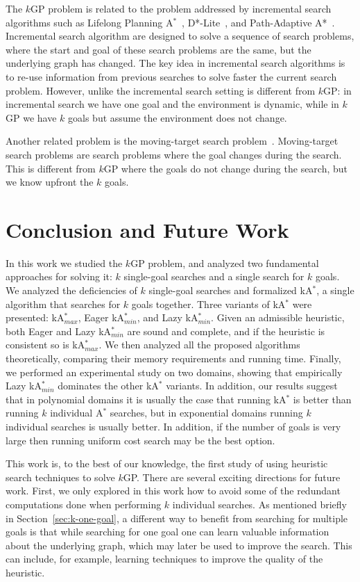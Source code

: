 \documentclass{aicom2e}
\newcommand{\kgs}{$k$GP}
\newcommand{\astar}{A$^*$}
\newcommand{\kastar}{kA$^*$}
\newcommand{\kastarmin}{kA$^*_{min}$}
\newcommand{\kastarmax}{kA$^*_{max}$}
\begin{document}
The \kgs{} problem is related to the problem addressed by incremental search algorithms such as Lifelong Planning \astar{}~\cite{koenig2004lifelong},  D*-Lite~\cite{koenig2005fast}, and Path-Adaptive A*~\cite{hernandez2015reusing}. Incremental search algorithm are designed to solve a sequence of search problems, where the start and goal of these search problems are the same, but the underlying graph has changed. The key idea in incremental search algorithms is to re-use information from previous searches to solve faster the current search problem. However, unlike the incremental search setting is different from \kgs{}: in incremental search we have one goal and the environment is dynamic, while in \kgs{} we have $k$ goals but assume the environment does not change.

Another related problem is the moving-target search problem~\cite{koenig2007speeding,ishida1991moving}. Moving-target search problems are search problems where the goal changes during the search. This is different from \kgs{} where the goals do not change during the search, but we know upfront the $k$ goals.


\section{Conclusion and Future Work}
In this work we studied the \kgs{} problem, and analyzed two fundamental approaches for solving it: $k$ single-goal searches and a single search for $k$ goals. We analyzed the deficiencies of $k$ single-goal searches and formalized \kastar{}, a single algorithm that searches for $k$ goals together.
Three variants of \kastar{} were presented: \kastarmax{}, Eager \kastarmin{}, and Lazy \kastarmin{}. Given an admissible heuristic, both Eager and Lazy \kastarmin{} are sound and complete, and if the heuristic is consistent so is \kastarmax{}. We then analyzed all the proposed algorithms theoretically, comparing their memory requirements and running time. Finally, we performed an experimental study on two domains, showing that empirically Lazy \kastarmin{} dominates the other \kastar{} variants. In addition, our results suggest that
in polynomial domains it is usually the case that running \kastar{} is better than running $k$ individual \astar{} searches, but in exponential domains running $k$ individual searches is usually better. In addition, if the number of goals is very large then running uniform cost search may be the best option.


This work is, to the best of our knowledge, the first study of using heuristic search techniques to solve \kgs{}. There are several exciting directions for future work. First, we only explored in this work how to avoid some of the redundant computations done when performing $k$ individual searches. As mentioned briefly in Section~\ref{sec:k-one-goal}, a different way to benefit from searching for multiple goals is that while searching for one goal one can learn valuable information about the underlying graph, which may later be used to improve the search. This can include, for example, learning techniques to improve the quality of the heuristic.
\end{document}
